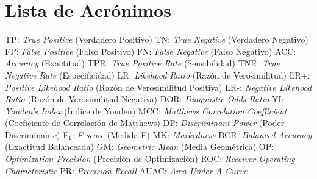 \thispagestyle{empty}
\section*{Lista de Acrónimos}

TP: \textit{True Positive} (Verdadero Positivo)
\medbreak
TN: \textit{True Negative} (Verdadero Negativo)
\medbreak
FP: \textit{False Positive} (Falso Positivo)
\medbreak
FN: \textit{False Negative} (Falso Negativo)
\medbreak
ACC: \textit{Accuracy} (Exactitud)
\medbreak
TPR: \textit{True Positive Rate} (Sensibilidad)
\medbreak
TNR: \textit{True Negative Rate} (Especificidad)
\medbreak
LR: \textit{Likehood Ratio} (Razón de Verosimilitud)
\medbreak
LR+: \textit{Positive Likehood Ratio} (Razón de Verosimilitud Positiva)
\medbreak
LR-: \textit{Negative Likehood Ratio} (Razón de Verosimilitud Negativa)
\medbreak
DOR: \textit{Diagnostic Odds Ratio}
\medbreak
YI: \textit{Youden's Index} (Índice de Youden)
\medbreak
MCC: \textit{Matthews Correlation Coefficient} (Coeficiente de Correlación de Matthews)
\medbreak
DP: \textit{Discriminant Power} (Poder Discriminante)
\medbreak
F$_{1}$: \textit{F-score} (Medida F)
\medbreak
MK: \textit{Markedness}
\medbreak
BCR: \textit{Balanced Accuracy} (Exactitud Balanceada)
\medbreak
GM: \textit{Geometric Mean} (Media Geométrica)
\medbreak
OP: \textit{Optimization Precision} (Precisión de Optimización)
\medbreak
ROC: \textit{Receiver Operating Characteristic}
\medbreak
PR: \textit{Precision Recall}
\medbreak
AUAC: \textit{Area Under A-Curve}


\clearpage